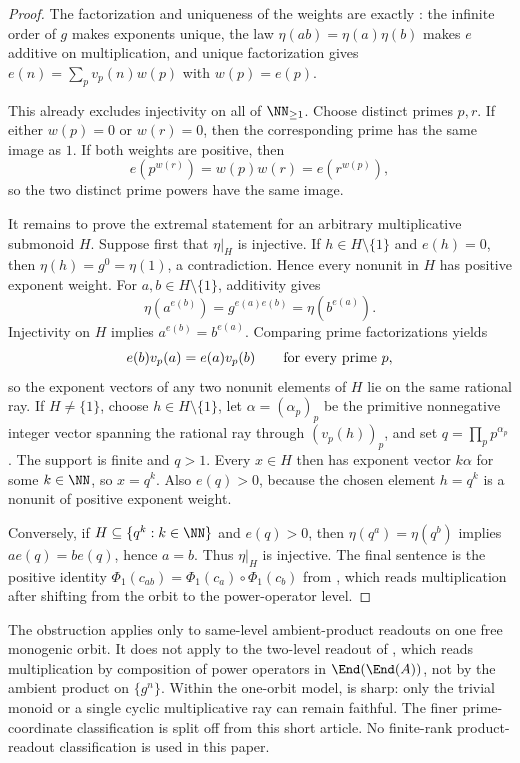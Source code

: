 \begin{proof}
The factorization and uniqueness of the weights are exactly
: the infinite order of \(g\) makes
exponents unique, the law \(\eta(ab)=\eta(a)\eta(b)\) makes \(e\) additive on
multiplication, and unique factorization gives
\(e(n)=\sum_p v_p(n)w(p)\) with \(w(p)=e(p)\).

This already excludes injectivity on all of \(\NN_{\ge1}\).  Choose distinct
primes \(p,r\).  If either \(w(p)=0\) or \(w(r)=0\), then the corresponding prime
has the same image as \(1\).  If both weights are positive, then
\[
  e(p^{w(r)})=w(p)w(r)=e(r^{w(p)}),
\]
so the two distinct prime powers have the same image.

It remains to prove the extremal statement for an arbitrary multiplicative
submonoid \(H\).  Suppose first that \(\eta|_H\) is injective.  If
\(h\in H\setminus\{1\}\) and \(e(h)=0\), then \(\eta(h)=g^0=\eta(1)\), a
contradiction.  Hence every nonunit in \(H\) has positive exponent weight.  For
\(a,b\in H\setminus\{1\}\), additivity gives
\[
  \eta(a^{e(b)})=g^{e(a)e(b)}=\eta(b^{e(a)}).
\]
Injectivity on \(H\) implies \(a^{e(b)}=b^{e(a)}\).  Comparing prime
factorizations yields
\[
  e(b)v_p(a)=e(a)v_p(b)
  \qquad\hbox{for every prime }p,
\]
so the exponent vectors of any two nonunit elements of \(H\) lie on the same
rational ray.  If \(H\ne\{1\}\), choose \(h\in H\setminus\{1\}\), let
\(\alpha=(\alpha_p)_p\) be the primitive nonnegative integer vector spanning the
rational ray through \((v_p(h))_p\), and set \(q=\prod_p p^{\alpha_p}\).  The
support is finite and \(q>1\).  Every \(x\in H\) then has exponent vector
\(k\alpha\) for some \(k\in\NN\), so \(x=q^k\).  Also \(e(q)>0\), because the
chosen element \(h=q^k\) is a nonunit of positive exponent weight.

Conversely, if \(H\subseteq\{q^k:k\in\NN\}\) and \(e(q)>0\), then
\(\eta(q^a)=\eta(q^b)\) implies \(ae(q)=be(q)\), hence \(a=b\).  Thus
\(\eta|_H\) is injective.  The final sentence is the positive identity
\(\Phi_1(c_{ab})=\Phi_1(c_a)\circ\Phi_1(c_b)\) from , which
reads multiplication after shifting from the orbit to the power-operator level.
\end{proof}

The obstruction applies only to same-level ambient-product readouts on one free
monogenic orbit.  It does not apply to the two-level readout of
, which reads multiplication by composition of power operators
in \(\End(\End(A))\), not by the ambient product on \(\{g^n\}\).  Within the
one-orbit model,  is sharp: only the trivial
monoid or a single cyclic multiplicative ray can remain faithful.  The finer
prime-coordinate classification is split off from this short article.  No
finite-rank product-readout classification is used in this paper.

